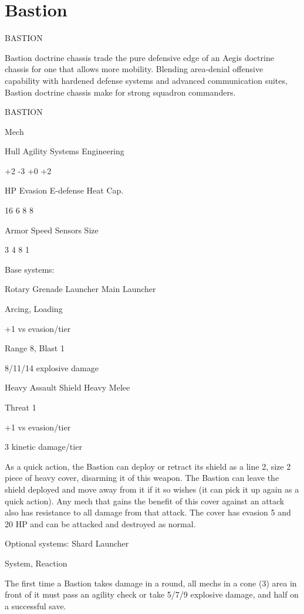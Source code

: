 \section{Bastion}

                                               BASTION

Bastion doctrine chassis trade the pure defensive edge of an Aegis doctrine chassis for one that
allows more mobility. Blending area-denial offensive capability with hardened defense systems
and advanced communication suites, Bastion doctrine chassis make for strong squadron
commanders.

 BASTION

 Mech

 Hull       Agility     Systems       Engineering

 +2         -3          +0            +2

 HP         Evasion      E-defense    Heat Cap.

 16         6           8             8

 Armor      Speed       Sensors       Size

 3          4           8             1

Base systems:

Rotary Grenade Launcher
Main Launcher

Arcing, Loading

+1 vs evasion/tier

Range 8, Blast 1

8/11/14 explosive damage


Heavy Assault Shield
Heavy Melee

Threat 1

+1 vs evasion/tier

3 kinetic damage/tier

As a quick action, the Bastion can deploy or retract its shield as a line 2, size 2 piece of heavy
cover, disarming it of this weapon. The Bastion can leave the shield deployed and move away
from it if it so wishes (it can pick it up again as a quick action). Any mech that gains the benefit of
this cover against an attack also has resistance to all damage from that attack. The cover has
evasion 5 and 20 HP and can be attacked and destroyed as normal.


Optional systems:
Shard Launcher

System, Reaction





The first time a Bastion takes damage in a round, all mechs in a cone (3) area in front of it must
pass an agility check or take 5/7/9 explosive damage, and half on a successful save.


